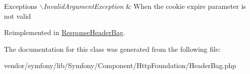 \begin{DoxyExceptions}{\-Exceptions}
{\em $\backslash$\-Invalid\-Argument\-Exception} & \-When the cookie expire parameter is not valid \\
\hline
\end{DoxyExceptions}


\-Reimplemented in \hyperlink{class_symfony_1_1_component_1_1_http_foundation_1_1_response_header_bag_a645f6c034cd6799b47bef2bc43e7056f}{\-Response\-Header\-Bag}.



\-The documentation for this class was generated from the following file\-:\begin{DoxyCompactItemize}
\item 
vendor/symfony/lib/\-Symfony/\-Component/\-Http\-Foundation/\-Header\-Bag.\-php\end{DoxyCompactItemize}
